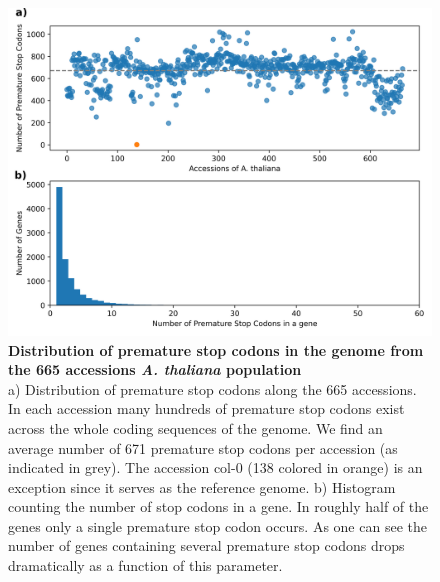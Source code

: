\begin{figure}[tb]
    \centering
    \begin{minipage}[h]{0.9\textwidth}
      \centering
      \includegraphics[width=1\textwidth]{images/Distribution_Premature_Stop_Codons.png}
      \caption[Distribution of premature stop codons in the genome from the 665 accessions \textit{A. thaliana} population]{\textbf{Distribution of premature stop codons in the genome from the 665 accessions \textit{A. thaliana} population}\\
      a) Distribution of premature stop codons along the 665 accessions. In each accession many hundreds of premature stop codons exist across the whole coding sequences of the genome. We find an average number of 671 premature stop codons per accession (as indicated in grey). The accession col-0 (138 colored in orange) is an exception since it serves as the reference genome. b) Histogram counting the number of stop codons in a gene. In roughly half of the genes only a single premature stop codon occurs. As one can see the number of genes containing several premature stop codons drops dramatically as a function of this parameter.}
     \label{fig:Distribution_Premature_Stop_Codons_all}
    \end{minipage}
  \end{figure} 

